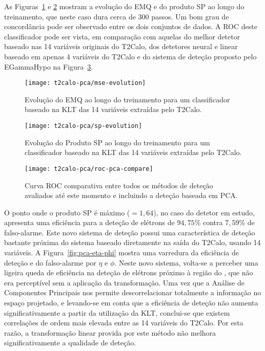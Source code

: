 As Figuras~\ref{fig:pca-mse-evo} e \ref{fig:pca-sp-evo} mostram a evolução do
EMQ e do produto SP ao longo do treinamento, que neste caso dura cerca de 300
passos. Um bom grau de concordância pode ser observado entre os dois conjuntos
de dados. A ROC deste classificador pode ser vista, em comparação com aquelas
do melhor detetor baseado nas 14 variáveis originais do T2Calo, dos detetores
neural e linear baseado em apenas 4 variáveis do T2Calo e do sistema de
deteção proposto pelo EGammaHypo na Figura~\ref{fig:pca-rocs}.

\begin{figure}
\begin{center}
\texttt{[image: t2calo-pca/mse-evolution]}
\end{center}
\caption{Evolução do EMQ ao longo do treinamento para um classificador baseado
na KLT das 14 variáveis extraídas pelo T2Calo.}
\label{fig:pca-mse-evo}
\end{figure}

\begin{figure}
\begin{center}
\texttt{[image: t2calo-pca/sp-evolution]}
\end{center}
\caption{Evolução do Produto SP ao longo do treinamento para um classificador
baseado na KLT das 14 variáveis extraídas pelo T2Calo.}
\label{fig:pca-sp-evo}
\end{figure}

\begin{figure}
\begin{center}
\texttt{[image: t2calo-pca/roc-pca-compare]}
\end{center}
\caption{Curva ROC comparativa entre todos os métodos de deteção avaliados até
este momento e incluindo a deteção baseada em PCA.}
\label{fig:pca-rocs}
\end{figure}

O ponto onde o produto SP é máximo ($=1,64$), no caso do detetor em estudo,
apresenta uma eficiência para a deteção de elétrons de $94,75$\% contra
$7,59$\% de falso-alarme. Este novo sistema de deteção possui uma
característica de deteção bastante próxima do sistema baseado diretamente na
saída do T2Calo, usando 14 variáveis. A Figura~\ref{fig:pca-eta-phi} mostra
uma varredura da eficiência de deteção e do falso-alarme por $\eta$ e
$\phi$. Neste novo sistema, volta-se a perceber uma ligeira queda de
eficiência na deteção de elétrons próximo à região do , que não era
perceptível sem a aplicação da transformação. Uma vez que a Análise de
Componentes Principais nos permite descorrelacionar totalmente a informação no
espaço projetado, e levando-se em conta que a eficiência de deteção não
aumenta significativamente a partir da utilização da KLT, conclui-se que
existem correlações de ordem mais elevada entre as 14 variáveis do T2Calo. Por
esta razão, a transformação linear provida por este método não melhora
significativamente a qualidade de deteção.

